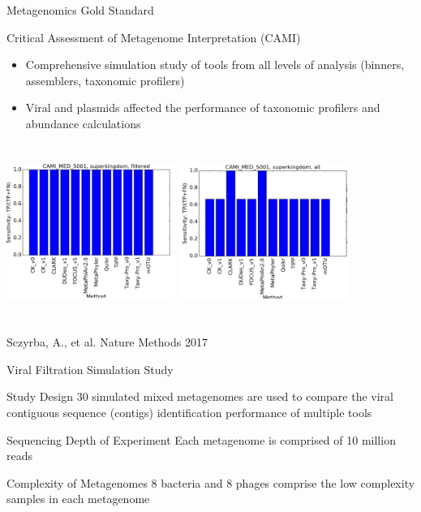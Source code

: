 \documentclass[11pt]{beamer}
\begin{document}
	
	\begin{frame}{Metagenomics Gold Standard}
	
	\begin{block}{Critical Assessment of Metagenome Interpretation (CAMI)}
	\vspace{-0.3cm}
	\begin{itemize}
	\item Comprehensive simulation study of tools from all levels of analysis (binners, assemblers, taxonomic profilers) \\
	\item Viral and plasmids affected the performance of taxonomic profilers and abundance calculations
	\end{itemize}
	\end{block}
	\begin{columns}
	\includegraphics[height=5cm, width=5.5cm]{Filtered.png}
	\includegraphics[height=5cm, width=5.5cm]{unfiltered.png}
	\end{columns}
	
	\tiny{Sczyrba, A., et al. Nature Methods 2017}
	\end{frame}
	

	
	\begin{frame}{Viral Filtration Simulation Study}
	\begin{block}{Study Design}
	30 simulated mixed metagenomes are used to compare the viral contiguous sequence (contigs) identification performance of multiple tools
	\end{block}

	\begin{block}{Sequencing Depth of Experiment} 
	Each metagenome is comprised of 10 million reads
	\end{block}
	\begin{block}{Complexity of Metagenomes}
	8 bacteria and 8 phages comprise the low complexity samples in each metagenome
	\end{block}

	\end{frame}
	
\end{document}
